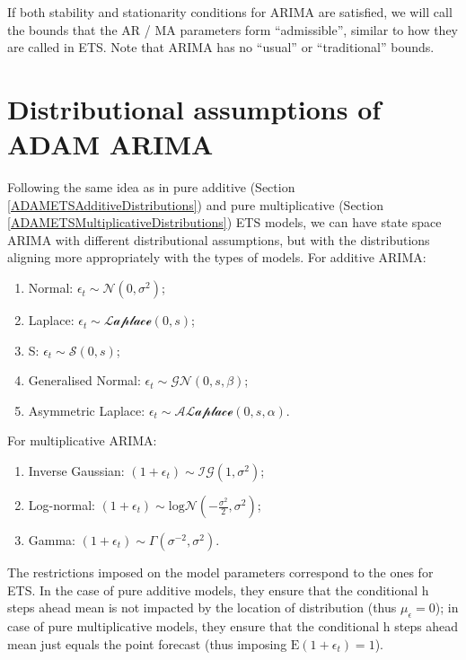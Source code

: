 \documentclass[
]{book}
\providecommand{\tightlist}{%
  \setlength{\itemsep}{0pt}\setlength{\parskip}{0pt}}
\theoremstyle{definition}
\theoremstyle{definition}
\theoremstyle{definition}
\theoremstyle{definition}
\theoremstyle{remark}
\begin{document}
If both stability and stationarity conditions for ARIMA are satisfied, we will call the bounds that the AR / MA parameters form ``admissible'', similar to how they are called in ETS. Note that ARIMA has no ``usual'' or ``traditional'' bounds.

\hypertarget{ADAMARIMADistributions}{%
\section{Distributional assumptions of ADAM ARIMA}\label{ADAMARIMADistributions}}

Following the same idea as in pure additive (Section \ref{ADAMETSAdditiveDistributions}) and pure multiplicative (Section \ref{ADAMETSMultiplicativeDistributions}) ETS models, we can have state space ARIMA with different distributional assumptions, but with the distributions aligning more appropriately with the types of models. For additive ARIMA:

\begin{enumerate}
\def\labelenumi{\arabic{enumi}.}
\tightlist
\item
  Normal: \(\epsilon_t \sim \mathcal{N}(0, \sigma^2)\);
\item
  Laplace: \(\epsilon_t \sim \mathcal{Laplace}(0, s)\);
\item
  S: \(\epsilon_t \sim \mathcal{S}(0, s)\);
\item
  Generalised Normal: \(\epsilon_t \sim \mathcal{GN}(0, s, \beta)\);
\item
  Asymmetric Laplace: \(\epsilon_t \sim \mathcal{ALaplace}(0, s, \alpha)\).
\end{enumerate}

For multiplicative ARIMA:

\begin{enumerate}
\def\labelenumi{\arabic{enumi}.}
\tightlist
\item
  Inverse Gaussian: \(\left(1+\epsilon_t \right) \sim \mathcal{IG}(1, \sigma^2)\);
\item
  Log-normal: \(\left(1+\epsilon_t \right) \sim \text{log}\mathcal{N}\left(-\frac{\sigma^2}{2}, \sigma^2\right)\);
\item
  Gamma: \(\left(1+\epsilon_t \right) \sim \mathcal{\Gamma}(\sigma^{-2}, \sigma^2)\).
\end{enumerate}

The restrictions imposed on the model parameters correspond to the ones for ETS. In the case of pure additive models, they ensure that the conditional h steps ahead mean is not impacted by the location of distribution (thus \(\mu_\epsilon=0\)); in case of pure multiplicative models, they ensure that the conditional h steps ahead mean just equals the point forecast (thus imposing \(\mathrm{E}(1+\epsilon_t)=1\)).
\end{document}
